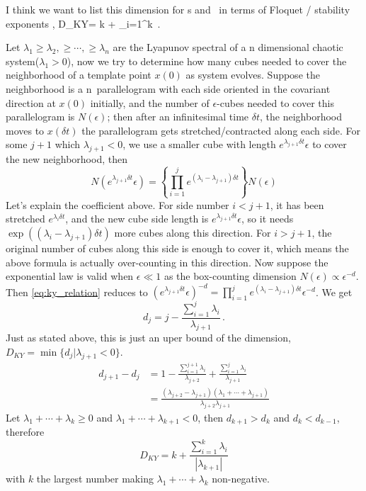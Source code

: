 I think we want to
list this dimension for \rpo s and \reqva\ in terms of Floquet /
stability exponents \eigRe[i],
\beq
    D_{KY}= k +  \sum_{i=1}^k \eigRe[i]
\,.


Let $\lambda_1 \ge \lambda_2, \ge \cdots, \ge \lambda_n$
are the Lyapunov spectral
of a n dimensional chaotic system($\lambda_1 > 0$), now we try to
determine how many cubes needed to cover the neighborhood of a template
point $x(0)$ as system evolves. Suppose the neighborhood is a
n\dmn\ parallelogram with each side oriented in the covariant
direction at $x(0)$ initially, and the number of $\epsilon$-cubes needed
to cover this parallelogram is $N(\epsilon)$; then after an infinitesimal
time $\delta t$, the neighborhood moves to $x(\delta t)$ the parallelogram
gets stretched/contracted along each side. For some $j+1$ which
$\lambda_{j+1} < 0$, we use a smaller cube with length
$e^{\lambda_{j+1} \delta t}\epsilon$ to cover the new neighborhood, then
\begin{equation}
N(e^{\lambda_{j+1} \delta t}\epsilon) =
\left\{ \prod_{i=1}^{j} e^{(\lambda_i - \lambda_{j+1})\delta t}\right\}
N(\epsilon)
\label{eq:ky_relation}
\end{equation}
Let's explain the coefficient above.
For side number $i<j+1$, it has been stretched $e^{\lambda_i \delta t}$, and the
new cube side length is $e^{\lambda_{j+1} \delta t}\epsilon$, so it needs
$\exp((\lambda_i - \lambda_{j+1})\delta t)$ more cubes along this direction.
For $i > j+1$, the original number of cubes along this side is enough to
cover it, which means the above formula is actually
over-counting in this direction. Now suppose the exponential law is valid
when $\epsilon \ll 1$ as the box-counting dimension
$N(\epsilon) \propto \epsilon^{-d}$. Then \eqref{eq:ky_relation} reduces to
$(e^{\lambda_{j+1} \delta t}\epsilon)^{-d}  =
\prod_{i=1}^{j} e^{(\lambda_i - \lambda_{j+1})\delta t} \epsilon^{-d}$. We get
\[
d_j = j - \frac{\sum_{i=1}^{j} \lambda_i}{\lambda_{j+1}}
\,.
\]
Just as stated above, this is just an uper bound of the dimension,
$D_{KY} = \min\{d_j | \lambda_{j+1} < 0\}$.
\begin{align*}
  d_{j+1} - d_j &= 1 -\frac{\sum_{i=1}^{j+1} \lambda_i}{\lambda_{j+2}}
  + \frac{\sum_{i=1}^{j} \lambda_i}{\lambda_{j+1}} \\
  & = \frac{(\lambda_{j+2} - \lambda_{j+1})(\lambda_1 + \cdots + \lambda_{j+1})}
  {\lambda_{j+2}\lambda_{j+1}}
\end{align*}
Let $\lambda_1 + \cdots + \lambda_k \ge 0$ and
$\lambda_1 + \cdots + \lambda_{k+1} < 0$, then $d_{k+1} > d_{k}$ and
$d_k < d_{k-1}$, therefore
\begin{equation}
  D_{KY} = k + \frac{\sum_{i=1}^{k} \lambda_i}{|\lambda_{k+1}|}
\end{equation}
with $k$ the largest number making $\lambda_1 + \cdots + \lambda_k$
non-negative.

